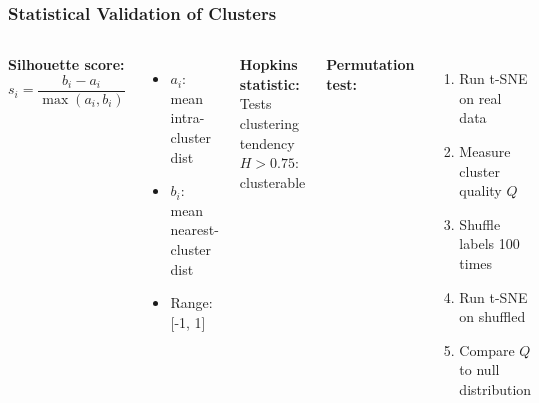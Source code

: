 \documentclass[aspectratio=169]{beamer}
\begin{document}
\begin{frame}
\frametitle{Statistical Validation of Clusters}
\begin{columns}[T]
\textbf{Silhouette score:}
$$s_i = \frac{b_i - a_i}{\max(a_i, b_i)}$$
\begin{itemize}
\small
\item $a_i$: mean intra-cluster dist
\item $b_i$: mean nearest-cluster dist
\item Range: [-1, 1]
\end{itemize}

\vspace{0.3cm}
\textbf{Hopkins statistic:}\\
\small Tests clustering tendency\\
$H > 0.75$: clusterable

\textbf{Permutation test:}
\begin{enumerate}
\small
\item Run t-SNE on real data
\item Measure cluster quality $Q$
\item Shuffle labels 100 times
\item Run t-SNE on shuffled
\item Compare $Q$ to null distribution
\end{enumerate}

\vspace{0.3cm}
\begin{center}
\end{center}
\end{columns}
\end{frame}
\end{document}
